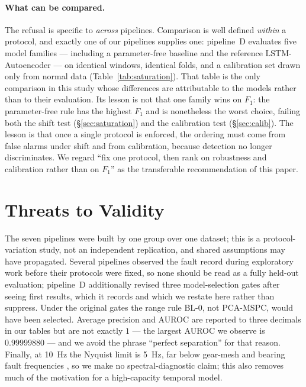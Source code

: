\documentclass{article}
\begin{document}
\paragraph{What can be compared.} The refusal is specific to \emph{across}
pipelines. Comparison is well defined \emph{within} a protocol, and exactly one
of our pipelines supplies one: pipeline~D evaluates five model families ---
including a parameter-free baseline and the reference LSTM-Autoencoder --- on
identical windows, identical folds, and a calibration set drawn only from
normal data (Table~\ref{tab:saturation}). That table is the only comparison in
this study whose differences are attributable to the models rather than to
their evaluation. Its lesson is not that one family wins on $F_1$: the
parameter-free rule has the highest $F_1$ and is nonetheless the worst choice,
failing both the shift test (\S\ref{sec:saturation}) and the calibration test
(\S\ref{sec:calib}). The lesson is that once a single protocol is enforced,
the ordering must come from false alarms under shift and from calibration,
because detection no longer discriminates. We regard ``fix one protocol, then
rank on robustness and calibration rather than on $F_1$'' as the transferable
recommendation of this paper.

\section{Threats to Validity}
\label{sec:limits}

The seven pipelines were built by one group over one dataset; this is a
protocol-variation study, not an independent replication, and shared
assumptions may have propagated. Several pipelines observed the fault record
during exploratory work before their protocols were fixed, so none should be
read as a fully held-out evaluation; pipeline~D additionally revised three
model-selection gates after seeing first results, which it records and which we
restate here rather than suppress. Under the original gates the range rule
BL-0, not PCA-MSPC, would have been selected. Average precision and AUROC are
reported to three decimals in our tables but are not exactly $1$ --- the
largest AUROC we observe is $0.99999880$ --- and we avoid the phrase ``perfect
separation'' for that reason. Finally, at \SI{10}{\hertz} the Nyquist limit is
\SI{5}{\hertz}, far below gear-mesh and bearing fault frequencies
\citep{randall2011rolling}, so we make no spectral-diagnostic claim; this also
removes much of the motivation for a high-capacity temporal model.
\end{document}
